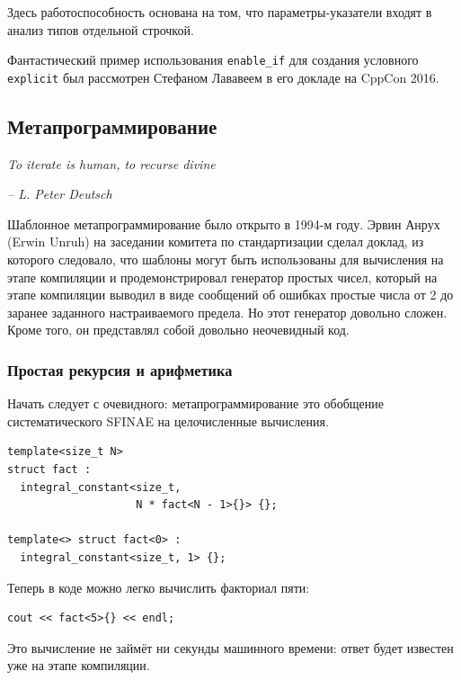 \documentclass[a4paper,12pt,oneside]{article}
\begin{document}
Здесь работоспособность основана на том, что параметры-указатели входят в анализ типов отдельной строчкой.

Фантастический пример использования \lstinline!enable_if! для создания условного \lstinline!explicit! был рассмотрен Стефаном Лававеем в его докладе на CppCon 2016.

\pagebreak
\subsection{Метапрограммирование}

\hfill\textit{To iterate is human, to recurse divine}{\vspace{0.5em}}

\hfill\textit{-- L. Peter Deutsch}

Шаблонное метапрограммирование было открыто в 1994-м году. Эрвин Анрух (Erwin Unruh) на заседании комитета по стандартизации сделал доклад, из которого следовало, что шаблоны могут быть использованы для вычисления на этапе компиляции и продемонстрировал генератор простых чисел, который на этапе компиляции выводил в виде сообщений об ошибках простые числа от 2 до заранее заданного настраиваемого предела. Но этот генератор довольно сложен. Кроме того, он представлял собой довольно неочевидный код.

\subsubsection{Простая рекурсия и арифметика}\label{SimpleRecursion}

Начать следует с очевидного: метапрограммирование это обобщение систематического SFINAE на целочисленные вычисления.

\begin{lstlisting}
template<size_t N>
struct fact : 
  integral_constant<size_t, 
                    N * fact<N - 1>{}> {}; 

template<> struct fact<0> : 
  integral_constant<size_t, 1> {};
\end{lstlisting}

Теперь в коде можно легко вычислить факториал пяти:

\begin{lstlisting}
cout << fact<5>{} << endl;
\end{lstlisting}

Это вычисление не займёт ни секунды машинного времени: ответ будет известен уже на этапе компиляции.
\end{document}
